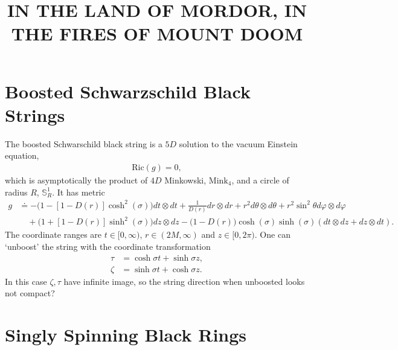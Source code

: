 \documentclass[11pt]{article}
\title{	\normalsize \textsc{} 	%
		 		\LARGE \textbf{\uppercase{In The Land of Mordor, In The Fires of Mount Doom}}	%
		}
\date{}
\renewcommand{\phi}{\varphi}
\begin{document}
 \maketitle
 \section{Boosted Schwarzschild Black Strings}
 The boosted Schwarschild black string is a $5D$ solution to the vacuum Einstein equation, 
 \begin{align}
 \mathrm{Ric}(g)=0,
 \end{align}
 which is asymptotically the product of $4D$ Minkowski, $\mathrm{Mink}_4$, and a circle of radius $R$, $\mathbb{S}^1_{R}$. It has metric
 \begin{align}
 g&\doteq-\big(1-[1-D(r)]\cosh^2(\sigma)\big)dt\otimes dt+\frac{1}{D(r)}dr\otimes dr+r^2d\theta\otimes d\theta+r^2\sin^2\theta d\phi\otimes d\phi\\
 &\nonumber\quad+\big(1+[1-D(r)]\sinh^2(\sigma)\big)dz\otimes dz-\big(1-D(r)\big)\cosh(\sigma)\sinh(\sigma)(dt\otimes dz+dz\otimes dt).
 \end{align}
 The coordinate ranges are $t\in[0,\infty)$, $r\in (2M,\infty)$ and $z\in [0,2\pi)$. One can `unboost' the string with the coordinate transformation
 \begin{align}
 \tau&=\cosh\sigma t+\sinh\sigma z,\\
 \zeta&=\sinh\sigma t+\cosh\sigma z.
 \end{align}
 In this case $\zeta,\tau $ have infinite image, so the string direction when unboosted looks not compact?
\section{Singly Spinning Black Rings}
\end{document}
